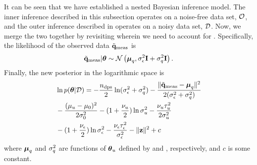 It can be seen that we have established a nested Bayesian inference model. The inner inference described in this subsection operates on a noise-free data set, $\mathcal{O}$, and the outer inference described in  operates on a noisy data set, $\mathcal{D}$. Now, we merge the two together by revisiting  wherein we need to account for . Specifically, the likelihood of the observed data $\tilde{\mathbf{q}}_{\text{meas}}$ is
\begin{equation} \elabel{noise-approximation-model}
  \mvT_\meas | \vparam \sim \gaussian{\vmean_\T}{\sigma_\noise^2 \mI + \sigma_\T^2 \mI}.
\end{equation}
Finally, the new posterior in the logarithmic space is
\begin{align}
  & \ln \f{\vparam | \Data} = -\frac{\ndcs}{2} \ln(\sigma^2_\noise + \sigma^2_\T) - \frac{\norm{\mvT_\meas - \vmean_\T}^2}{2(\sigma^2_\noise + \sigma^2_\T)} \nonumber \\
  & {} - \frac{(\mu_\u - \mu_0)^2}{2 \sigma^2_0} - (1 + \frac{\nu_\u}{2}) \ln \sigma^2_\u - \frac{\nu_\u \tau_\u^2}{2 \sigma^2_\u} \nonumber \\
  & {} - (1 + \frac{\nu_\noise}{2}) \ln \sigma^2_\noise - \frac{\nu_\noise \tau_\noise^2}{\sigma^2_\noise} - \norm{\vz}^2 + c \elabel{log-posterior}
\end{align}
where ${\boldsymbol\mu}_q$ and $\sigma^2_q$ are functions of ${\boldsymbol\theta}_u$ defined by  and , respectively, and $c$ is some constant.
